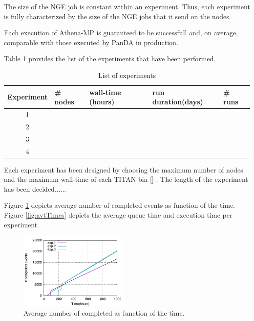 The size of the NGE job is constant within an experiment. Thus, each experiment is fully characterized by the size of the NGE jobs that it send on the nodes.

Each execution of Athena-MP is guaranteed to be successfull and, on average, comparable with those executed by PanDA in production.  

Table \ref{tab:experiments} provides the list of the experiments that have been performed.

\begin{table}
\begin{center}
\begin{tabular}{|c|l|l|l|l|}
  \hline
Experiment &\# nodes &wall-time (hours) & run duration(days) & \# runs   \\
\hline
1 & &  & &   \\
2 & &  & &  \\
3 & &  & &  \\
4 & &  & &  \\
\hline
\end{tabular}
\end{center}
\caption{List of experiments}\label{tab:experiments}
\end{table}

Each experiment has been designed by choosing the maximum number of nodes and the maximum wall-time of each TITAN bin \ref{} . The length of the experiment has been decided......

Figure \ref{fig:avtEvts} depicts average number of completed events as function of the time. Figure \ref{fig:avtTimes}  depicts the average queue time and execution time per experiment.

\begin{figure}[!htb]
        \includegraphics[width=0.48\textwidth]{./figures/draft/mean.pdf}
    \caption{Average number of completed as function of the time.}
\label{fig:avtEvts}
\end{figure}

